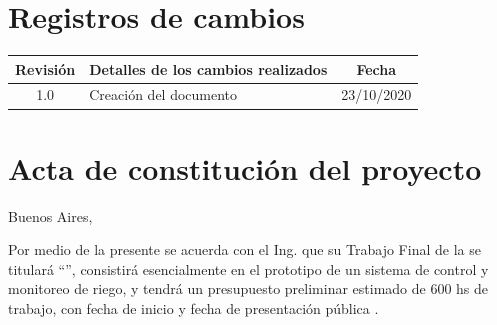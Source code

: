 \documentclass[11pt]{charter}
\begin{document}
\maketitle
\thispagestyle{empty}
\pagebreak


\thispagestyle{empty}
{\setlength{\parskip}{0pt}
\tableofcontents{}
}
\pagebreak


\section{Registros de cambios}
\label{sec:registro}


\begin{table}[ht]
\label{tab:registro}
\centering
\begin{tabularx}{\linewidth}{@{}|c|X|c|@{}}
\hline
\rowcolor[HTML]{C0C0C0} 
Revisión & \multicolumn{1}{c|}{\cellcolor[HTML]{C0C0C0}Detalles de los cambios realizados} & Fecha      \\ \hline
1.0      & Creación del documento                                          & 23/10/2020 \\ \hline
\end{tabularx}
\end{table}

\pagebreak



\section{Acta de constitución del proyecto}
\label{sec:acta}

\begin{flushright}
Buenos Aires, \fechaInicioName
\end{flushright}

\vspace{2cm}

Por medio de la presente se acuerda con el Ing. \authorname\hspace{1px} que su Trabajo Final de la \degreename\hspace{1px} se titulará ``\ttitle'', consistirá esencialmente en el prototipo de un sistema de control y monitoreo de riego, y tendrá un presupuesto preliminar estimado de 600 hs de trabajo, con fecha de inicio \fechaInicioName\hspace{1px} y fecha de presentación pública \fechaFinalName.
\end{document}
